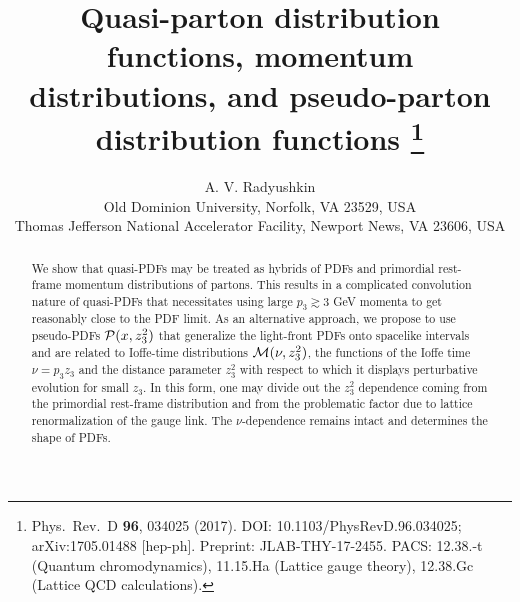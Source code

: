 \documentclass[11pt]{article}
\title{Quasi-parton distribution functions, momentum distributions,
and pseudo-parton distribution functions%
\thanks{Phys.\ Rev.\ D {\bf 96}, 034025 (2017).
DOI: 10.1103/PhysRevD.96.034025;
arXiv:1705.01488 [hep-ph].
Preprint: JLAB-THY-17-2455.
PACS: 12.38.-t (Quantum chromodynamics), 11.15.Ha (Lattice gauge theory),
12.38.Gc (Lattice QCD calculations).}}
\author{A. V. Radyushkin\\[2pt]
\normalsize Old Dominion University, Norfolk, VA 23529, USA\\
\normalsize Thomas Jefferson National Accelerator Facility,
Newport News, VA 23606, USA}
\date{}
\begin{document}
\maketitle

\begin{abstract}
We show that quasi-PDFs may be treated as hybrids of PDFs and
primordial rest-frame
momentum distributions of partons.
This results in a complicated convolution nature of quasi-PDFs that
necessitates using large $p_3 \gtrsim 3$ GeV
momenta to
get reasonably close to the PDF limit.
As an alternative approach,
we propose to use
pseudo-PDFs ${\cal P}(x, z_3^2)$ that generalize
the light-front PDFs onto spacelike intervals and are related to
Ioffe-time distributions ${\cal M} (\nu, z_3^2)$, the functions of
the Ioffe time $\nu = p_3 z_3$ and the distance parameter $z_3^2$
with respect to which it displays perturbative evolution for small $z_3$.
In this form, one may
divide out the $z_3^2$ dependence coming from the primordial rest-frame
distribution
and from the problematic factor due to lattice renormalization of the gauge link.
The $\nu$-dependence remains intact and determines the shape of PDFs.
\end{abstract}






\end{document}
